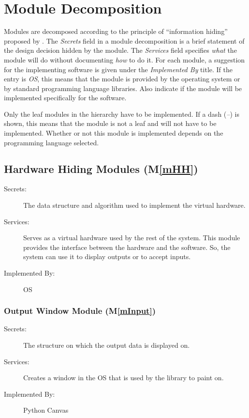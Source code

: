 \documentclass[12pt, titlepage]{article}
\newcommand{\mref}[1]{M\ref{#1}}
\begin{document}
\section{Module Decomposition} \label{SecMD}

Modules are decomposed according to the principle of ``information hiding''
proposed by \citet{ParnasEtAl1984}. The \emph{Secrets} field in a module
decomposition is a brief statement of the design decision hidden by the
module. The \emph{Services} field specifies \emph{what} the module will do
without documenting \emph{how} to do it. For each module, a suggestion for the
implementing software is given under the \emph{Implemented By} title. If the
entry is \emph{OS}, this means that the module is provided by the operating
system or by standard programming language libraries.  Also indicate if the
module will be implemented specifically for the software.

Only the leaf modules in the
hierarchy have to be implemented. If a dash (\emph{--}) is shown, this means
that the module is not a leaf and will not have to be implemented. Whether or
not this module is implemented depends on the programming language
selected.

\subsection{Hardware Hiding Modules (\mref{mHH})}

\begin{description}
\item[Secrets:]The data structure and algorithm used to implement the virtual
  hardware.
\item[Services:]Serves as a virtual hardware used by the rest of the
  system. This module provides the interface between the hardware and the
  software. So, the system can use it to display outputs or to accept inputs.
\item[Implemented By:] OS
\end{description}

\subsubsection{Output Window Module (\mref{mInput})}

\begin{description}
\item[Secrets:]The structure on which the output data is displayed on.
\item[Services:]Creates a window in the OS that is used by the library to paint on. 
\item[Implemented By:] Python Canvas
\end{description}
\end{document}

